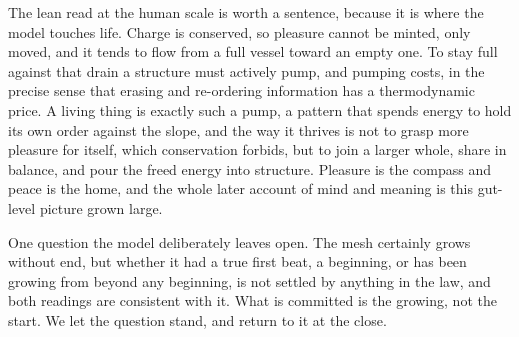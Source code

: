 The lean read at the human scale is worth a sentence, because it is where the model touches life. Charge is conserved, so pleasure cannot be minted, only moved, and it tends to flow from a full vessel toward an empty one. To stay full against that drain a structure must actively pump, and pumping costs, in the precise sense that erasing and re-ordering information has a thermodynamic price. A living thing is exactly such a pump, a pattern that spends energy to hold its own order against the slope, and the way it thrives is not to grasp more pleasure for itself, which conservation forbids, but to join a larger whole, share in balance, and pour the freed energy into structure. Pleasure is the compass and peace is the home, and the whole later account of mind and meaning is this gut-level picture grown large.

One question the model deliberately leaves open. The mesh certainly grows without end, but whether it had a true first beat, a beginning, or has been growing from beyond any beginning, is not settled by anything in the law, and both readings are consistent with it. What is committed is the growing, not the start. We let the question stand, and return to it at the close.
